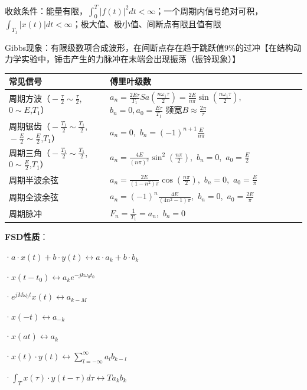 收敛条件：能量有限，$\int^T_0|f(t)|^2dt<\infty$；一个周期内信号绝对可积，$\int_{T_1}|x(t)|dt<\infty$；极大值、极小值、间断点有限且值有限

Gibbs现象：有限级数项合成波形，在间断点存在趋于跳跃值9\%的过冲【在结构动力学实验中，锤击产生的力脉冲在末端会出现振荡（振铃现象）】

\begin{center}
	\begin{tabularx}{\columnwidth}{|p{45pt}|X|}
		\hline
		常见信号 & 傅里叶级数 \\
		\hline
		周期方波（$\!-\!\frac{\tau}{2}\!\sim\!\frac{\tau}{2}$,$0\!\sim\!E$,$T_1$） & 
		$a_n\!=\!\frac{2E\tau}{T_1}Sa(\frac{n\omega_1\tau}{2})=\!\frac{2E}{n\pi}\!\sin(\frac{n\omega_1\tau}{2})$,\ $b_n\!=\!0, a_0=\!\frac{E\tau}{T_1}$\quad
		频宽$B\!\approx\!\frac{2\pi}{\tau}$ \\
		\hline
		周期锯齿（$\!-\!\frac{T_1}{2}\!\sim\!\frac{T_1}{2}$,$\!-\!\frac{E}{2}\!\sim\!\frac{E}{2}$,$T_1$） & 
		$a_n\!=\!0$,\ $b_n\!=\!(-1)^{n+1}\frac{E}{n\pi}$ \\
		\hline
		周期三角（$\!-\!\frac{T_1}{2}\!\sim\!\frac{T_1}{2}$,$0\!\sim\!\frac{E}{2}$,$T_1$） & 
		$a_n\!=\!\frac{4E}{(n\pi)^2}\sin^2(\frac{n\pi}{2})$,\ $b_n\!=\!0$,\ $a_0=\!\frac{E}{2}$ \\
		\hline
		周期半波余弦 & 
		$a_n\!=\!\frac{2E}{(1\!-\!n^2)\pi}\cos(\frac{n\pi}{2})$,\ $b_n\!=\!0$,\ $a_0=\!\frac{E}{\pi}$ \\
		\hline
		周期全波余弦 & 
		$a_n\!=\!(-1)^n\frac{4E}{(4n^2\!-\!1)\pi}$,\ $b_n\!=\!0$,\ $a_0=\!\frac{2E}{\pi}$ \\
		\hline
		周期脉冲 & 
		$F_n\!=\!\frac{1}{T_1}\!=\!a_n$,\ $b_n\!=\!0$ \\
		\hline
	\end{tabularx}
\end{center}

\textbf{FSD性质}：

·$a \cdot x(t) + b \cdot y(t) \longleftrightarrow a \cdot a_{k} + b \cdot b_{k}$

·$x(t-t_{0}) \longleftrightarrow a_{k} e^{-j k \omega_{0} t_{0}}$

·$e^{j M \omega_{0} t} x(t) \longleftrightarrow a_{k-M}$

·$x(-t) \longleftrightarrow a_{-k}$

·$x(a t) \longleftrightarrow a_{k}$

·$x(t) \cdot y(t) \longleftrightarrow \sum\limits_{l=-\infty}^{\infty} a_{l} b_{k-l}$

·$\int_{T} x(\tau) \cdot y(t-\tau) d \tau \longleftrightarrow T a_{k} b_{k}$

